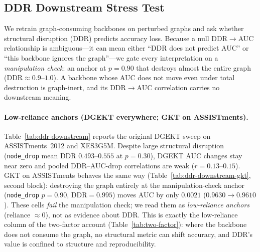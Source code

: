 \documentclass[pdflatex,sn-mathphys-num]{sn-jnl}
\newcommand{\DDR}{\textsc{DDR}}
\begin{document}
\subsection{\DDR{} Downstream Stress Test}
\label{sec:exp-ddr-downstream}


We retrain graph-consuming backbones on perturbed graphs and ask whether
structural disruption (\DDR{}) predicts accuracy loss. Because a null
\DDR{}$\to$AUC relationship is ambiguous---it can mean either ``\DDR{} does not
predict AUC'' or ``this backbone ignores the graph''---we gate every
interpretation on a \emph{manipulation check}: an anchor at $p{=}0.90$ that
destroys almost the entire graph (\DDR{}${\approx}0.9$--$1.0$). A backbone whose
AUC does not move even under total destruction is graph-inert, and its
\DDR{}$\to$AUC correlation carries no downstream meaning.

\paragraph{Low-reliance anchors (DGEKT everywhere; GKT on ASSISTments).}
Table~\ref{tab:ddr-downstream} reports the original DGEKT sweep on
ASSISTments~2012 and XES3G5M. Despite large structural disruption
(\texttt{node\_drop} mean \DDR{} $0.493$--$0.555$ at $p{=}0.30$), DGEKT AUC
changes stay near zero and pooled \DDR{}--AUC-drop correlations are weak
($r{=}0.13$--$0.15$). GKT on ASSISTments behaves the same way
(Table~\ref{tab:ddr-downstream-gkt}, second block): destroying the graph
entirely at the manipulation-check anchor (\texttt{node\_drop} $p{=}0.90$,
\DDR{}${=}0.995$) moves AUC by only $0.0021$ ($0.9630{\to}0.9610$). These cells
\emph{fail} the manipulation check; we read them as \emph{low-reliance anchors}
(reliance ${\approx}0$), not as evidence about \DDR{}. This is exactly the
low-reliance column of the two-factor account (Table~\ref{tab:two-factor}):
where the backbone does not consume the graph, no structural metric can shift
accuracy, and \DDR{}'s value is confined to structure and reproducibility.
\end{document}
